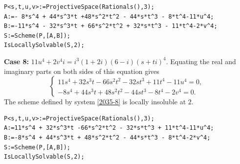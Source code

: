 \documentclass[a4paper,12pt,english,reqno]{amsart}
\begin{document}
\begin{lstlisting}
P<s,t,u,v>:=ProjectiveSpace(Rationals(),3);
A:=- 8*s^4 + 44*s^3*t +48*s^2*t^2 - 44*s*t^3 - 8*t^4-11*u^4;
B:=-11*s^4 - 32*s^3*t + 66*s^2*t^2 + 32*s*t^3 - 11*t^4-2*v^4;
S:=Scheme(P,[A,B]);
IsLocallySolvable(S,2);
\end{lstlisting}
{\bf Case 8:} $11u^4+2v^4i=i^3(1+2i)(6-i)(s+ti)^4$. Equating the real and imaginary parts on both sides of this equation gives
\begin{equation}\label{2035-8}
\begin{cases}
11s^4 + 32s^3t - 66s^2t^2 - 32st^3 + 11t^4 - 11u^4=0,\\
-8s^4 + 44s^3t + 48s^2t^2 - 44st^3 - 8t^4 - 2v^4=0.
\end{cases}
\end{equation}
The scheme defined by system \eqref{2035-8} is locally insoluble at $2$.


\begin{lstlisting}
P<s,t,u,v>:=ProjectiveSpace(Rationals(),3);
A:=11*s^4 + 32*s^3*t -66*s^2*t^2 - 32*s*t^3 + 11*t^4-11*u^4;
B:=-8*s^4 + 44*s^3*t + 48*s^2*t^2 - 44*s*t^3 - 8*t^4-2*v^4;
S:=Scheme(P,[A,B]);
IsLocallySolvable(S,2);
\end{lstlisting}
\end{document}
